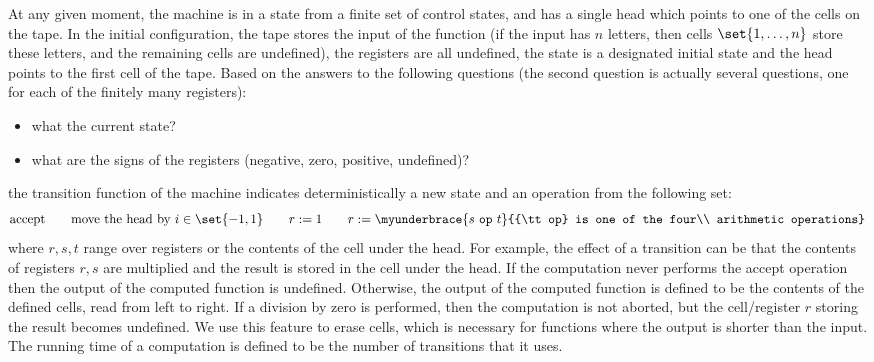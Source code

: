 At any given moment, the machine  is in a state  from a finite set of control states, and has a single head which points to one of the cells on the tape. In the initial configuration,  the tape stores the input of the function (if the input has $n$ letters, then cells $\set{1,\ldots,n}$ store these letters, and the remaining cells are undefined), the registers are all undefined, the state is a  designated initial state and the head points to the first cell of the tape. Based on the answers to the following questions (the second question is actually several questions, one for each of the finitely many registers):
\begin{itemize}
	\item what  the current state?
	\item what are the signs of the registers (negative, zero, positive, undefined)?
\end{itemize}
the transition function of the machine indicates deterministically a new state and  an operation from the following set:
\begin{align*}
\text{accept} \qquad \text{move the head by } i \in \set{-1,1} \qquad   r := 1 \qquad  r := \myunderbrace{s\  \mathtt{op}\  t}{{\tt op} is one of the four\\ arithmetic operations}
\end{align*}
where  $r,s,t$ range over registers or the contents of the cell under the head. For example, the effect of a transition can be that the contents of registers $r,s$ are multiplied and the result is stored in the cell under the head. If the computation never performs the accept operation  then  the output of the computed  function is undefined. Otherwise, the output of the computed function is defined to be the contents of the defined cells, read from left to right. If a division by zero is performed, then the computation is  not aborted, but the cell/register $r$ storing the result becomes undefined.  We use this feature to erase cells, which is necessary for functions where the  output is shorter than the input. The running time of a computation is defined to be the number of transitions that it uses.



